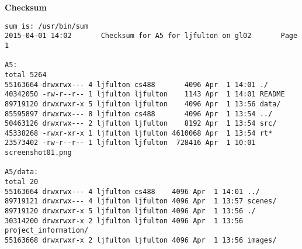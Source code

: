 \documentclass[12pt]{article}
\begin{document}
\newpage
{} 
\noindent \begin{flushleft}

\nocite{*}

\thispagestyle{empty}
\par\end{flushleft}

\newpage
{} 
\begin{flushleft}
\Large
\textbf{Checksum}
\end{flushleft}

\footnotesize
\begin{verbatim}
sum is: /usr/bin/sum
2015-04-01 14:02       Checksum for A5 for ljfulton on gl02       Page 1

A5:
total 5264
55163664 drwxrwx--- 4 ljfulton cs488       4096 Apr  1 14:01 ./
40342050 -rw-r--r-- 1 ljfulton ljfulton    1143 Apr  1 14:01 README
89719120 drwxrwxr-x 5 ljfulton ljfulton    4096 Apr  1 13:56 data/
85595897 drwxrwx--- 8 ljfulton cs488       4096 Apr  1 13:54 ../
50463126 drwxrwx--- 2 ljfulton ljfulton    8192 Apr  1 13:54 src/
45338268 -rwxr-xr-x 1 ljfulton ljfulton 4610068 Apr  1 13:54 rt*
23573402 -rw-r--r-- 1 ljfulton ljfulton  728416 Apr  1 10:01 screenshot01.png

A5/data:
total 20
55163664 drwxrwx--- 4 ljfulton cs488    4096 Apr  1 14:01 ../
89719121 drwxrwx--- 4 ljfulton ljfulton 4096 Apr  1 13:57 scenes/
89719120 drwxrwxr-x 5 ljfulton ljfulton 4096 Apr  1 13:56 ./
30314200 drwxrwxr-x 2 ljfulton ljfulton 4096 Apr  1 13:56 project_information/
55163668 drwxrwxr-x 2 ljfulton ljfulton 4096 Apr  1 13:56 images/


\end{verbatim}
\end{document}
